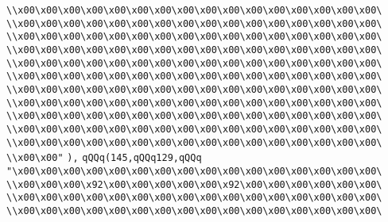 \verb|\\x00\x00\x00\x00\x00\x00\x00\x00\x00\x00\x00\x00\x00\x00\x00\x00\|\newline
\verb|\\x00\x00\x00\x00\x00\x00\x00\x00\x00\x00\x00\x00\x00\x00\x00\x00\|\newline
\verb|\\x00\x00\x00\x00\x00\x00\x00\x00\x00\x00\x00\x00\x00\x00\x00\x00\|\newline
\verb|\\x00\x00\x00\x00\x00\x00\x00\x00\x00\x00\x00\x00\x00\x00\x00\x00\|\newline
\verb|\\x00\x00\x00\x00\x00\x00\x00\x00\x00\x00\x00\x00\x00\x00\x00\x00\|\newline
\verb|\\x00\x00\x00\x00\x00\x00\x00\x00\x00\x00\x00\x00\x00\x00\x00\x00\|\newline
\verb|\\x00\x00\x00\x00\x00\x00\x00\x00\x00\x00\x00\x00\x00\x00\x00\x00\|\newline
\verb|\\x00\x00\x00\x00\x00\x00\x00\x00\x00\x00\x00\x00\x00\x00\x00\x00\|\newline
\verb|\\x00\x00\x00\x00\x00\x00\x00\x00\x00\x00\x00\x00\x00\x00\x00\x00\|\newline
\verb|\\x00\x00\x00\x00\x00\x00\x00\x00\x00\x00\x00\x00\x00\x00\x00\x00\|\newline
\verb|\\x00\x00\x00\x00\x00\x00\x00\x00\x00\x00\x00\x00\x00\x00\x00\x00\|\newline
\verb|\\x00\x00"|\newline
\verb|),|\newline
\verb|qQQq(145,qQQq129,qQQq|\newline
\verb|"\x00\x00\x00\x00\x00\x00\x00\x00\x00\x00\x00\x00\x00\x00\x00\x00\|\newline
\verb|\\x00\x00\x00\x92\x00\x00\x00\x00\x00\x92\x00\x00\x00\x00\x00\x00\|\newline
\verb|\\x00\x00\x00\x00\x00\x00\x00\x00\x00\x00\x00\x00\x00\x00\x00\x00\|\newline
\verb|\\x00\x00\x00\x00\x00\x00\x00\x00\x00\x00\x00\x00\x00\x00\x00\x00\|\newline
